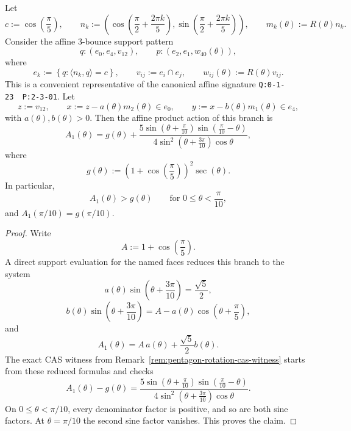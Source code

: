 \begin{unverified}
\begin{lemma}
\label{lem:pentagon-rotation-three-bounce-first-family}
Let
\[
  c := \cos\left(\frac{\pi}{5}\right),
  \qquad
  n_k := \left(
    \cos\left(\frac{\pi}{2} + \frac{2\pi k}{5}\right),
    \sin\left(\frac{\pi}{2} + \frac{2\pi k}{5}\right)
  \right),
  \qquad
  m_k(\theta) := R(\theta)n_k.
\]
Consider the affine 3-bounce support pattern
\[
  q : (e_0,e_4,v_{12}),
  \qquad
  p : (e_2,e_1,w_{40}(\theta)),
\]
where
\[
  e_k := \left\{ q : \langle n_k, q \rangle = c \right\},
  \qquad
  v_{ij} := e_i \cap e_j,
  \qquad
  w_{ij}(\theta) := R(\theta)v_{ij}.
\]
This is a convenient representative of the canonical affine signature
\texttt{Q:0-1-23\ \ P:2-3-01}.
Let
\[
  z := v_{12},
  \qquad
  x := z - a(\theta)m_2(\theta) \in e_0,
  \qquad
  y := x - b(\theta)m_1(\theta) \in e_4,
\]
with $a(\theta), b(\theta) > 0$.
Then the affine product action of this branch is
\[
  A_1(\theta)
  =
  g(\theta)
  +
  \frac{
    5\sin\left(\theta+\frac{\pi}{10}\right)
    \sin\left(\frac{\pi}{10}-\theta\right)
  }
  {
    4\sin^2\left(\theta+\frac{3\pi}{10}\right)\cos\theta
  },
\]
where
\[
  g(\theta)
  :=
  \left(1+\cos\left(\frac{\pi}{5}\right)\right)^2 \sec(\theta).
\]
In particular,
\[
  A_1(\theta) > g(\theta)
  \qquad
  \text{for } 0 \le \theta < \frac{\pi}{10},
\]
and $A_1(\pi/10)=g(\pi/10)$.
\end{lemma}

\begin{proof}
Write
\[
  A := 1+\cos\left(\frac{\pi}{5}\right).
\]
A direct support evaluation for the named faces reduces this branch to the
system
\[
  a(\theta)\sin\left(\theta+\frac{3\pi}{10}\right) = \frac{\sqrt{5}}{2},
\]
\[
  b(\theta)\sin\left(\theta+\frac{3\pi}{10}\right)
  =
  A - a(\theta)\cos\left(\theta+\frac{\pi}{5}\right),
\]
and
\[
  A_1(\theta)
  =
  A\,a(\theta) + \frac{\sqrt{5}}{2}b(\theta).
\]
The exact CAS witness from Remark~\ref{rem:pentagon-rotation-cas-witness}
starts from these reduced formulas and checks
\[
  A_1(\theta) - g(\theta)
  =
  \frac{
    5\sin\left(\theta+\frac{\pi}{10}\right)
    \sin\left(\frac{\pi}{10}-\theta\right)
  }
  {
    4\sin^2\left(\theta+\frac{3\pi}{10}\right)\cos\theta
  }.
\]
On $0 \le \theta < \pi/10$, every denominator factor is positive, and so are
both sine factors. At $\theta=\pi/10$ the second sine factor vanishes. This
proves the claim.
\end{proof}
\end{unverified}

